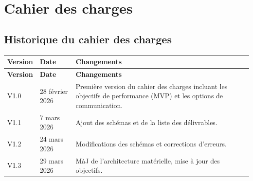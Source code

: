 
\section{Cahier des charges}
\subsection*{Historique du cahier des charges}

\begin{longtable}{|p{2cm}|p{3cm}|p{10cm}|}
\hline
\textbf{Version} & \textbf{Date} & \textbf{Changements} \\
\hline
\endfirsthead

\hline
\textbf{Version} & \textbf{Date} & \textbf{Changements} \\
\hline
\endhead

\hline
\endfoot

\hline
\endlastfoot
V1.0 & 28 février 2026 & Première version du cahier des charges incluant les objectifs de performance (MVP) et les options de communication.\\
\hline
V1.1 & 7 mars 2026 & Ajout des schémas et de la liste des délivrables.\\
\hline
V1.2 & 24 mars 2026 & Modifications des schémas et corrections d'erreurs.\\
\hline
V1.3 & 29 mars 2026 & MàJ de l'architecture matérielle, mise à jour des objectifs.\\\hline
\end{longtable}
